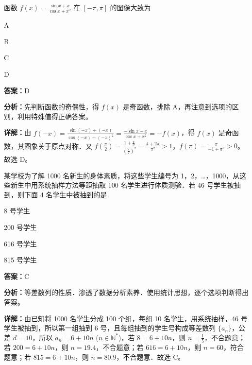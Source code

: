\begin{question}[points=5]
函数 $f(x)=\frac{\sin x + x}{\cos x + x^2}$ 在 $[-\pi,\pi]$ 的图像大致为
\begin{choices}
  \item A
  \item B
  \item C
  \item D
\end{choices}
\begin{solution}
\textbf{答案：}D

\textbf{分析：}先判断函数的奇偶性，得 $f(x)$ 是奇函数，排除 A，再注意到选项的区别，利用特殊值得正确答案。

\textbf{详解：}由 $f(-x)=\frac{\sin(-x)+(-x)}{\cos(-x)+(-x)^2} = \frac{-\sin x - x}{\cos x + x^2} = -f(x)$，得 $f(x)$ 是奇函数，其图象关于原点对称．又 $f(\frac{\pi}{2}) = \frac{1+\frac{\pi}{2}}{(\frac{\pi}{2})^2} = \frac{4+2\pi}{\pi^2} > 1$，$f(\pi) = \frac{\pi}{-1+\pi^2} > 0$。故选 D。
\end{solution}
\end{question}

\begin{question}[points=5]
某学校为了解 1000 名新生的身体素质，将这些学生编号为 1，2，…，1000，从这些新生中用系统抽样方法等距抽取 100 名学生进行体质测验．若 46 号学生被抽到，则下面 4 名学生中被抽到的是
\begin{choices}
  \item 8 号学生
  \item 200 号学生
  \item 616 号学生
  \item 815 号学生
\end{choices}
\begin{solution}
\textbf{答案：}C

\textbf{分析：}等差数列的性质．渗透了数据分析素养．使用统计思想，逐个选项判断得出答案。

\textbf{详解：}由已知将 1000 名学生分成 100 个组，每组 10 名学生，用系统抽样，46 号学生被抽到，所以第一组抽到 6 号，且每组抽到的学生号构成等差数列 $\{a_n\}$，公差 $d=10$，所以 $a_n = 6+10n$ ($n \in \mathbb{N}^*$)，若 $8=6+10n$，则 $n=\frac{1}{5}$，不合题意；若 $200=6+10n$，则 $n=19.4$，不合题意；若 $616=6+10n$，则 $n=60$，符合题意；若 $815=6+10n$，则 $n=80.9$，不合题意．故选 C。
\end{solution}
\end{question}

